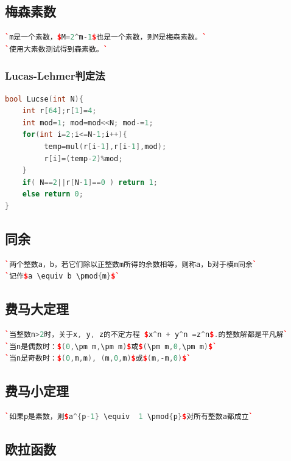 \documentclass[a4paper]{article}
\begin{document}
\begin{CJK*}{UTF8}{gbsn}
\begin{multicols}{3}
\begin{flushleft}
\subsection{梅森素数}
\begin{lstlisting}[language={c++}]
`m是一个素数，$M=2^m-1$也是一个素数，则M是梅森素数。`
`使用大素数测试得到森素数。`
\end{lstlisting}

\subsubsection{Lucas-Lehmer判定法}
\begin{lstlisting}[language={c++}]
bool Lucse(int N){
    int r[64];r[1]=4;
    int mod=1; mod=mod<<N; mod-=1;
    for(int i=2;i<=N-1;i++){
         temp=mul(r[i-1],r[i-1],mod);
         r[i]=(temp-2)%mod;
    }
    if( N==2||r[N-1]==0 ) return 1;
    else return 0;
}
\end{lstlisting}

\subsection{同余}
\begin{lstlisting}[language={c++}]
`两个整数a，b，若它们除以正整数m所得的余数相等，则称a，b对于模m同余`
`记作$a \equiv b \pmod{m}$`
\end{lstlisting}


\subsection{费马大定理}
\begin{lstlisting}[language={c++}]
`当整数n>2时，关于x, y, z的不定方程 $x^n + y^n =z^n$.的整数解都是平凡解`
`当n是偶数时：$(0,\pm m,\pm m)$或$(\pm m,0,\pm m)$`
`当n是奇数时：$(0,m,m), (m,0,m)$或$(m,-m,0)$`
\end{lstlisting}



\subsection{费马小定理}
\begin{lstlisting}[language={c++}]
`如果p是素数，则$a^{p-1} \equiv  1 \pmod{p}$对所有整数a都成立`
\end{lstlisting}


\subsection{欧拉函数}


\end{flushleft}
\end{multicols}
\end{CJK*}
\end{document}
